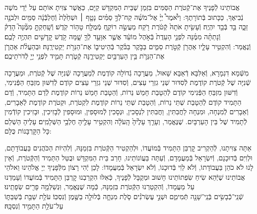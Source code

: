 \documentclass[twoside, openany, parskip=half, 11pt]{book}
\begin{document}
\newcommand{\ketoret}{
\firstword{אַתָּה הוּא יְיָ אֱלֹהֵינוּ שֶׁהִקְטִירוּ}
אֲבוֹתֵינוּ לְֿפָנֶיךָ אֶת־קְֿטֹרֶת הַסַּמִּים בִּזְמַן שֶׁבֵּית הַמִּקְדָּשׁ קַיָּם, כַּאֲשֶׁר צִוִּיתָ אוֹתָם עַל יְֿדֵי מֹשֶׁה נְֿבִיאֶךָ, כַּכָּתוּב בְּֿתוֹרָתֶךָ: 
וַיֹּ֩אמֶר֩ יְיָ֨ אֶל־מֹשֶׁ֜ה קַח־לְֿךָ֣ סַמִּ֗ים\source{שמות ל} נָטָ֤ף ׀ וּשְׁחֵ֙לֶת֙ וְֿחֶלְבְּֿֿנָ֔ה סַמִּ֖ים וּלְבֹנָ֣ה זַכָּ֑ה בַּ֥ד בְּֿבַ֖ד יִהְיֶֽה׃ וְֿעָשִׂ֤יתָ אֹתָהּ֙ קְֿטֹ֔רֶת רֹ֖קַח מַעֲשֵׂ֣ה רוֹקֵ֑חַ מְֿמֻלָּ֖ח טָה֥וֹר קֹֽדֶשׁ׃ וְֿשָֽׁחַקְתָּ֣ מִמֶּ֘נָּה֮ הָדֵק֒ וְֿנָתַתָּ֨ה מִמֶּ֜נָּה לִפְנֵ֤י הָעֵדֻת֙ בְּֿאֹ֣הֶל מוֹעֵ֔ד אֲשֶׁ֛ר אִוָּעֵ֥ד לְֿךָ֖ שָׁ֑מָּה קֹ֥דֶשׁ קׇֽדָשִׁ֖ים תִּהְיֶ֥ה לָכֶֽם׃\\
וְֿנֶאֱמַר: וְֿהִקְטִ֥יר עָלָ֛יו אַהֲרֹ֖ן קְֿטֹ֣רֶת סַמִּ֑ים בַּבֹּ֣קֶר בַּבֹּ֗קֶר בְּֿהֵיטִיב֛וֹ אֶת־הַנֵּרֹ֖ת יַקְטִירֶֽנָּה׃ וּבְהַעֲלֹ֨ת אַהֲרֹ֧ן אֶת־הַנֵּרֹ֛ת בֵּ֥ין הָעַרְבַּ֖יִם יַקְטִירֶ֑נָּה קְֿטֹ֧רֶת תָּמִ֛יד לִפְנֵ֥י יְיָ֖ לְֿדֹרֹתֵיכֶֽם׃


}
\\
\tamid
\\
\ketoret
{}  מִשְּֿׁמָא דִגְמָרָא, וְֿאַלִּבָּא דְֿאַבָּא שָׁאוּל, מַעֲרָכָה גְֿדוֹלָה קוֹדֶמֶת לְֿמַעֲרָכָה שְֿׁנִיָּה שֶׁל קְֿטֹרֶת, וּמַעֲרָכָה שְֿׁנִיָּה שֶׁל קְֿטֹרֶת קוֹדֶמֶת לְֿסִדּוּר שְׁנֵי גִזְרֵי עֵצִים, וְֿסִדּוּר שְׁנֵי גִזְרֵי עֵצִים קוֹדֶם לְֿדִשּׁוּן מִזְבֵּחַ הַפְּֿנִימִי, וְֿדִשּׁוּן מִזְבֵּחַ הַפְּֿנִימִי קוֹדֶם לְֿהַטָבַת חָמֵשׁ נֵרוֹת, וְֿהַטָבַת חָמֵשׁ נֵרוֹת קוֹדֶמֶת לְֿדַם הַתָּמִיד, וְֿדַם הַתָּמִיד קוֹדֶם לְֿהַטָבַת שְׁתֵּי נֵרוֹת, וְֿהַטָבַת שְׁתֵּי נֵרוֹת קוֹדֶמֶת לִקְטֹרֶת, וּקְטֹרֶת קוֹדֶמֶת לְֿאֵבָרִים, וְֿאֵבָרִים לְֿמִנְחָה, וּמִנְחָה לַחֲבִתִּין, וַחֲבִתִּין לִנְסָכִין, וּנְסָכִין לְֿמוּסָפִין, וּמוּסָפִין לְֿבָזִיכִין, וּבָזִיכִין קוֹדְֿמִין לְֿתָמִיד שֶׁל בֵּין הָעַרְבָּיִם. שֶׁנֶּאֱמַר, וְעָרַ֤ךְ  עָלֶ֙יהָ֙ הָֽעֹלָ֔ה וְהִקְטִ֥יר עָלֶ֖יהָ חֶלְבֵ֥י הַשְּׁלָמִֽים׃ עָלֶיהָ הַשְׁלֵם כָּל הַקׇּרְבָּנוֹת כֻּלָּם:

 אַתָּה צִוִּיתָנוּ, לְֿהַקְרִיב קׇרְבַּן הַתָּמִיד בְּֿמוֹעֲדוֹ, וּלְהַקְטִיר הַקְּֿטֹרֶת בִּזְמַנָּהּ, וְֿלִהְיוֹת הַכֹּהֲנִים בַּעֲבוֹדָתָם, וּלְוִיִּם בְּֿדוּכָנָם, וְֿיִשְׂרָאֵל בְּֿמַעֲמָדָם, וְֿעַתָּה בַּעֲוֹנוֹתֵינוּ, חָרַב בֵּית הַמִּקְדָּשׁ וּבֻטַּל הַתָּמִיד וְֿהַקְּֿטֹרֶת, וְֿאֵין לָנוּ לֹא כֹהֵן בַּעֲבוֹדָתוֹ, וְֿלֹא לֵוִי בְּֿדוּכָנוֹ, וְֿלֹא יִשְׂרָאֵל בְּֿמַעֲמָדוֹ: לָכֵן יְֿהִי רָצוֹן מִלְּֿפָנֶיךָ יְיָ אֱלֹהֵינוּ וֵאלֹהֵי אֲבוֹתֵינוּ שֶׁיְּֿהֵא שִׂיחַ שִׂפְתוֹתֵינוּ חָשׁוּב וּמְקֻבָּל לְֿפָנֶיךָ, כְּֿאִלּוּ הִקְרַבְנוּ קׇרְבַּן הַתָּמִיד בְּֿמוֹעֲדוֹ וְֿעָמַדְנוּ עַל מַעֲמָדוֹ, וְֿהִקְטַרְנוּ הַקְּֿטֹרֶת בִּזְמַנָּהּ, כְּֿמָה שֶׁנֶּאֱמַר, וּֽנְשַׁלְּמָ֥ה  פָרִ֖ים שְׂפָתֵֽינוּ׃\\
\shabbos
{}
 שְֿׁנֵֽי־כְֿֿבָשִׂ֥ים בְּֿנֵֽי־שָׁנָ֖ה תְּֿמִימִ֑ם וּשְׁנֵ֣י עֶשְׂרֹנִ֗ים סֹ֧לֶת מִנְחָ֛ה בְּֿלוּלָ֥ה בַשֶּׁ֖מֶן וְֿנִסְכּֽוֹ׃
 עֹלַ֥ת שַׁבַּ֖ת בְּֿשַׁבַּתּ֑וֹ עַל־עֹלַ֥ת הַתָּמִ֖יד וְֿנִסְכָּֽהּ׃
\end{document}
